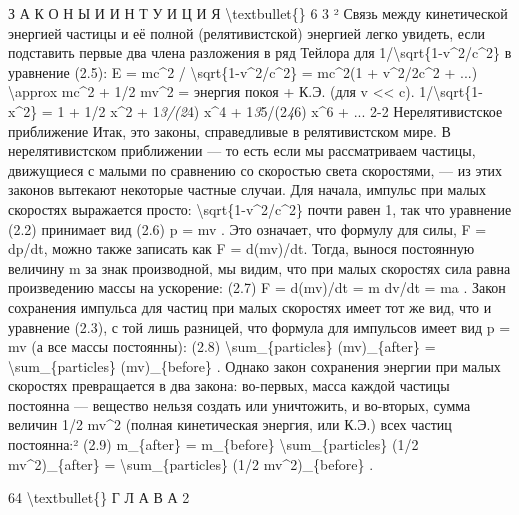 \documentclass[10pt,oneside]{article}
\begin{document}
З А К О Н Ы  И  И Н Т У И Ц И Я \textbackslash{}textbullet\{\} 6 3 ² Связь между кинетической энергией частицы и её полной (релятивистской) энергией легко увидеть, если подставить первые два члена разложения в ряд Тейлора для 1/\textbackslash{}sqrt\{1-v\textasciicircum{}2/c\textasciicircum{}2\} в уравнение (2.5): E = mc\textasciicircum{}2 / \textbackslash{}sqrt\{1-v\textasciicircum{}2/c\textasciicircum{}2\} = mc\textasciicircum{}2(1 + v\textasciicircum{}2/2c\textasciicircum{}2 + ...) \textbackslash{}approx mc\textasciicircum{}2 + 1/2 mv\textasciicircum{}2 = энергия покоя + К.Э. (для v << c). 1/\textbackslash{}sqrt\{1-x\textasciicircum{}2\} = 1 + 1/2 x\textasciicircum{}2 + 1\emph{3/(2}4) x\textasciicircum{}4 + 1\emph{3}5/(2\emph{4}6) x\textasciicircum{}6 + ... 2-2 Нерелятивистское приближение Итак, это законы, справедливые в релятивистском мире. В нерелятивистском приближении --- то есть если мы рассматриваем частицы, движущиеся с малыми по сравнению со скоростью света скоростями, --- из этих законов вытекают некоторые частные случаи. Для начала, импульс при малых скоростях выражается просто: \textbackslash{}sqrt\{1-v\textasciicircum{}2/c\textasciicircum{}2\} почти равен 1, так что уравнение (2.2) принимает вид (2.6) p = mv . Это означает, что формулу для силы, F = dp/dt, можно также записать как F = d(mv)/dt. Тогда, вынося постоянную величину m за знак производной, мы видим, что при малых скоростях сила равна произведению массы на ускорение: (2.7) F = d(mv)/dt = m dv/dt = ma . Закон сохранения импульса для частиц при малых скоростях имеет тот же вид, что и уравнение (2.3), с той лишь разницей, что формула для импульсов имеет вид p = mv (а все массы постоянны): (2.8) \textbackslash{}sum\_\{particles\} (mv)\_\{after\} = \textbackslash{}sum\_\{particles\} (mv)\_\{before\} . Однако закон сохранения энергии при малых скоростях превращается в два закона: во-первых, масса каждой частицы постоянна --- вещество нельзя создать или уничтожить, и во-вторых, сумма величин 1/2 mv\textasciicircum{}2 (полная кинетическая энергия, или К.Э.) всех частиц постоянна:² (2.9) m\_\{after\} = m\_\{before\} \textbackslash{}sum\_\{particles\} (1/2 mv\textasciicircum{}2)\_\{after\} = \textbackslash{}sum\_\{particles\} (1/2 mv\textasciicircum{}2)\_\{before\} .\par

64 \textbackslash{}textbullet\{\} Г Л А В А  2\par
\end{document}
